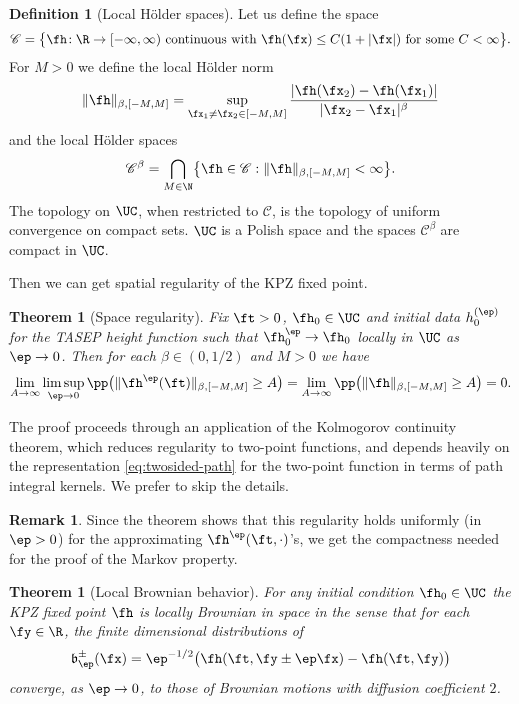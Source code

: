 \documentclass[]{pcmi}
\theoremstyle{plain}
\newtheorem{theorem}[equation]{Theorem}
\theoremstyle{definition}
\newtheorem{definition}[equation]{Definition}
\newtheorem{remark}[equation]{Remark}
\begin{document}
\begin{definition}[Local H\"older spaces]
Let us define the space 
\[
\mathscr C= \bigl\{ \fh\!:\R \to [-\infty,\infty) ~\text{continuous with}~\fh(\fx)\le C(1+|\fx|)~\text{for some}~ C<\infty\bigr\}.
\] 
For $M > 0$ we define the local H\"older norm
 \begin{equation}
 \| \fh \|_{\beta, [-M,M]} = \sup_{\fx_1\neq \fx_2 \in [-M,M]} \frac{ |\fh(\fx_2)-\fh(\fx_1)|}{|\fx_2-\fx_1|^\beta}
 \end{equation}
 and the local H\"older spaces
\[\mathscr C^\beta= \bigcap_{M \in \N} \bigl\{ \fh\in \mathscr C : \| \fh \|_{\beta, [-M,M]} <\infty\bigr\}.\]
The topology on $\UC$, when restricted to $\mathscr C$, is the topology of uniform convergence on compact sets.
$\UC$ is a Polish space and the spaces $\mathscr C^\beta$ are compact in $\UC$.
\end{definition} 

Then we can get spatial regularity of the KPZ fixed point.

\begin{theorem}[Space regularity]\label{reg}
Fix $\ft>0$, $\fh_0\in \UC$ and initial data $h_0^{(\ep)}$ for the TASEP height function such that $\fh_0^\ep\rightarrow\fh_0$ locally in $\UC$ as $\ep\to0$.
Then for each $\beta\in (0,1/2)$ and $M > 0$ we have
\begin{equation}
\lim_{A\to \infty} \limsup_{\ep\to 0} \pp \bigl( \| \fh^\ep(\ft)\|_{\beta, [-M,M]}\ge A\bigr) = \lim_{A\to \infty} \pp\bigl( \| \fh\|_{\beta, [-M,M]}\ge A\bigr) =0.
\end{equation}
\end{theorem}

\noindent 
The proof proceeds through an application of the Kolmogorov continuity theorem, which reduces regularity to two-point functions, and depends heavily on the representation \eqref{eq:twosided-path} for the two-point function in terms of path integral kernels. We prefer to skip the details.

\begin{remark}
Since the theorem shows that this regularity holds uniformly (in $\ep>0$) for the approximating $\fh^{\ep}(\ft,\cdot)$'s, we get the compactness needed for the proof of the Markov property.
\end{remark}

\begin{theorem}[Local Brownian behavior]
For any initial condition $\fh_0\in\UC$ the KPZ fixed point $\fh$ is locally Brownian in space in the sense that for each $\fy\in\R$, the finite dimensional distributions of 
\[\mathfrak{b}^{\pm}_\ep(\fx)= \ep^{-1/2} \bigl(\fh(\ft,\fy \pm \ep \fx)-\fh(\ft,\fy) \bigr)\]
converge, as $\ep\to 0$, to those of Brownian motions with diffusion coefficient $2$.
\end{theorem}
\end{document}
